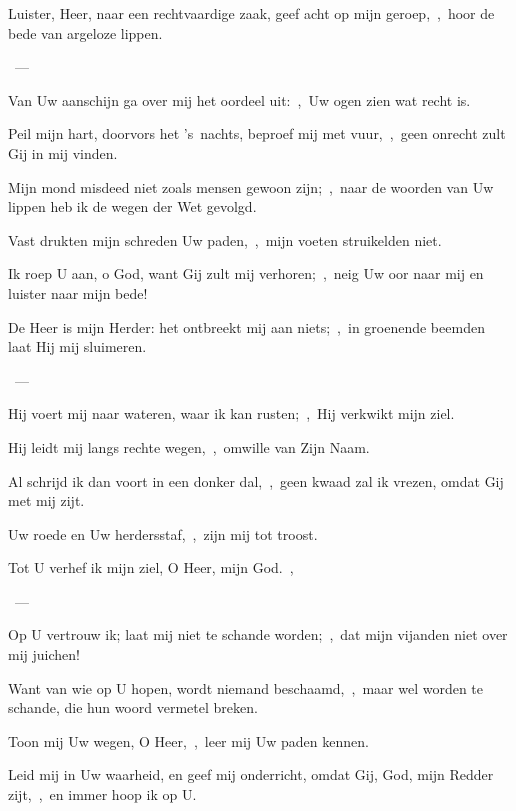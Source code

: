 \documentclass[12pt,twoside,a5paper]{article}
\begin{document}

\begin{halfparskip}
  Luister, Heer, naar een rechtvaardige zaak, geef acht op mijn geroep,~\sep\ hoor de bede van argeloze lippen.

  ~--- 

  Van Uw aanschijn ga over mij het oordeel uit:~\sep\ Uw ogen zien wat recht is.

  Peil mijn hart, doorvors het 's~nachts, beproef mij met vuur,~\sep\ geen onrecht zult Gij in mij vinden.

  Mijn mond misdeed niet zoals mensen gewoon zijn;~\sep\ naar de woorden van Uw lippen heb ik de wegen der Wet gevolgd.

  Vast drukten mijn schreden Uw paden,~\sep\ mijn voeten struikelden niet.

  Ik roep U aan, o God, want Gij zult mij verhoren;~\sep\ neig Uw oor naar mij en luister naar mijn bede!
\end{halfparskip}


\begin{halfparskip}
  De Heer is mijn Herder: het ontbreekt mij aan niets;~\sep\ in groenende beemden laat Hij mij sluimeren.

  ~--- 

  Hij voert mij naar wateren, waar ik kan rusten;~\sep\ Hij verkwikt mijn ziel.

  Hij leidt mij langs rechte wegen,~\sep\ omwille van Zijn Naam.

  Al schrijd ik dan voort in een donker dal,~\sep\ geen kwaad zal ik vrezen, omdat Gij met mij zijt.

  Uw roede en Uw herdersstaf,~\sep\ zijn mij tot troost.
\end{halfparskip}


\begin{halfparskip}
  Tot U verhef ik mijn ziel, O Heer, mijn God.~\sep

  ~--- 

  Op U vertrouw ik; laat mij niet te schande worden;~\sep\ dat mijn vijanden niet over mij juichen!

  Want van wie op U hopen, wordt niemand beschaamd,~\sep\ maar wel worden te schande, die hun woord vermetel breken.

  Toon mij Uw wegen, O Heer,~\sep\ leer mij Uw paden kennen.

  Leid mij in Uw waarheid, en geef mij onderricht, omdat Gij, God, mijn Redder zijt,~\sep\ en immer hoop ik op U.
\end{halfparskip}
\end{document}
